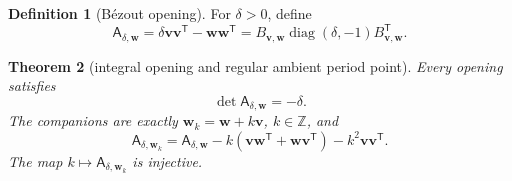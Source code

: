 \documentclass[11pt]{article}
\newtheorem{theorem}{Theorem}[section]
\theoremstyle{definition}
\newtheorem{definition}[theorem]{Definition}
\theoremstyle{remark}
\newcommand{\Z}{\mathbb Z}
\newcommand{\diag}{\operatorname{diag}}
\newcommand{\1}{\mathbf 1}
\begin{document}
\begin{definition}[Bézout opening]\label{def:opening}
For $\delta>0$, define
\begin{equation}\label{eq:Aopening}
 \mathsf A_{\delta,\mathbf w}
 =\delta\mathbf v\mathbf v^{\mathsf T}
  -\mathbf w\mathbf w^{\mathsf T}
 =B_{\mathbf v,\mathbf w}
  \diag(\delta,-1)
  B_{\mathbf v,\mathbf w}^{\mathsf T}.
\end{equation}
\end{definition}

\begin{theorem}[integral opening and regular ambient period point]
\label{thm:opening}
Every opening satisfies
\begin{equation}\label{eq:opening-det}
 \det\mathsf A_{\delta,\mathbf w}=-\delta.
\end{equation}
The companions are exactly
$\mathbf w_k=\mathbf w+k\mathbf v$, $k\in\Z$, and
\begin{equation}\label{eq:opening-torsor}
 \mathsf A_{\delta,\mathbf w_k}
 =\mathsf A_{\delta,\mathbf w}
 -k(\mathbf v\mathbf w^{\mathsf T}
    +\mathbf w\mathbf v^{\mathsf T})
 -k^2\mathbf v\mathbf v^{\mathsf T}.
\end{equation}
The map $k\mapsto\mathsf A_{\delta,\mathbf w_k}$ is injective.


\end{theorem}
\end{document}
